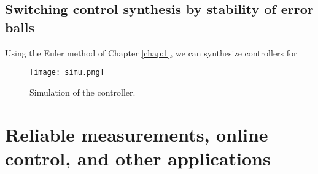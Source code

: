\subsection{Switching control synthesis by stability of error balls}
%
Using the Euler method of Chapter \ref{chap:1}, we can synthesize controllers for 
%
\begin{figure}
 \centering
 \texttt{[image: simu.png]}
 \caption{Simulation of the controller.}
 \label{fig:simu_pde}
\end{figure}


%
\section{Reliable measurements, online control, and other applications}
%
